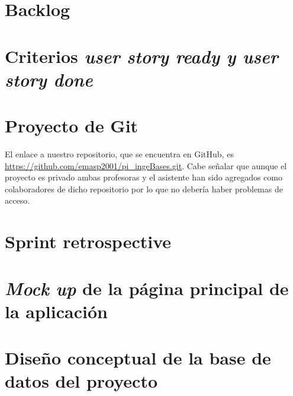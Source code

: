 \documentclass{article}
\begin{document}
\section{Backlog}

\section{Criterios \textit{user story ready y user story done}}

\section{Proyecto de Git}
El enlace a nuestro repositorio, que se encuentra en GitHub, es
\url{https://github.com/emasp2001/pi_ingeBases.git}. Cabe señalar que
aunque el proyecto es privado ambas profesoras y el asistente han sido
agregados como colaboradores de dicho repositorio por lo que no debería
haber problemas de acceso.

\section{Sprint retrospective}

\section{\textit{Mock up} de la página principal de la aplicación}

\section{Diseño conceptual de la base de datos del proyecto}


\newpage


\end{document}
